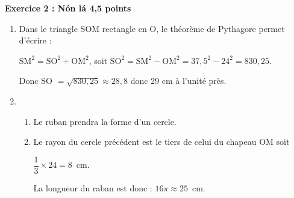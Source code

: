 \textbf{Exercice 2 : \og N\'on l\'a \fg{} \hfill 4,5 points}

\medskip  

%
%
%
%
%
%
 
\begin{enumerate}
\item %
Dans le triangle SOM rectangle en O, le théorème de Pythagore permet d'écrire :

$\text{SM}^2 = \text{SO}^2 + \text{OM}^2$, soit $\text{SO}^2 = \text{SM}^2 - \text{OM}^2 = 37,5^2 - 24^2 = 830,25$.

Donc SO $ = \sqrt{830,25} \approx 28,8$ donc 29 cm à l'unité près.
\item %

	\begin{enumerate}
		\item %
Le ruban prendra la forme d'un cercle. 
		\item %
Le rayon du cercle précédent est le tiers de celui du chapeau OM soit 

$\dfrac{1}{3} \times 24 = 8$~cm.
		
La longueur du raban est donc : $16\pi \approx 25$~cm. 
	\end{enumerate}
\end{enumerate}

\vspace{0,5cm}


